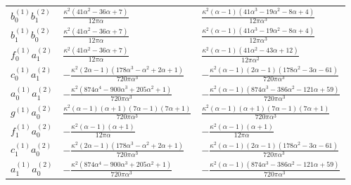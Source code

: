 {\begin{longtable}{lll}
$b_0^{(1)} b_1^{(2)}$ & $\frac{\kappa^{2} \left(41 \alpha^{2} - 36 \alpha + 7\right)}{12 \pi \alpha}$ & $\frac{\kappa^{2} \left(\alpha - 1\right) \left(41 \alpha^{3} - 19 \alpha^{2} - 8 \alpha + 4\right)}{12 \pi \alpha^{3}}$\\
$b_1^{(1)} b_0^{(2)}$ & $\frac{\kappa^{2} \left(41 \alpha^{2} - 36 \alpha + 7\right)}{12 \pi \alpha}$ & $\frac{\kappa^{2} \left(\alpha - 1\right) \left(41 \alpha^{3} - 19 \alpha^{2} - 8 \alpha + 4\right)}{12 \pi \alpha^{3}}$\\
$f_0^{(1)} a_1^{(2)}$ & $\frac{\kappa^{2} \left(41 \alpha^{2} - 36 \alpha + 7\right)}{12 \pi \alpha}$ & $\frac{\kappa^{2} \left(\alpha - 1\right) \left(41 \alpha^{2} - 43 \alpha + 12\right)}{12 \pi \alpha^{2}}$\\
$c_0^{(1)} a_1^{(2)}$ & $- \frac{\kappa^{2} \left(2 \alpha - 1\right) \left(178 \alpha^{3} - \alpha^{2} + 2 \alpha + 1\right)}{720 \pi \alpha^{3}}$ & $- \frac{\kappa^{2} \left(\alpha - 1\right) \left(2 \alpha - 1\right) \left(178 \alpha^{2} - 3 \alpha - 61\right)}{720 \pi \alpha^{3}}$\\
$a_0^{(1)} a_1^{(2)}$ & $- \frac{\kappa^{2} \left(874 \alpha^{4} - 900 \alpha^{3} + 205 \alpha^{2} + 1\right)}{720 \pi \alpha^{3}}$ & $- \frac{\kappa^{2} \left(\alpha - 1\right) \left(874 \alpha^{3} - 386 \alpha^{2} - 121 \alpha + 59\right)}{720 \pi \alpha^{3}}$\\
$g^{(1)} a_0^{(2)}$ & $\frac{\kappa^{2} \left(\alpha - 1\right) \left(\alpha + 1\right) \left(7 \alpha - 1\right) \left(7 \alpha + 1\right)}{720 \pi \alpha^{3}}$ & $\frac{\kappa^{2} \left(\alpha - 1\right) \left(\alpha + 1\right) \left(7 \alpha - 1\right) \left(7 \alpha + 1\right)}{720 \pi \alpha^{3}}$\\
$f_1^{(1)} a_0^{(2)}$ & $- \frac{\kappa^{2} \left(\alpha - 1\right) \left(\alpha + 1\right)}{12 \pi \alpha}$ & $- \frac{\kappa^{2} \left(\alpha - 1\right) \left(\alpha + 1\right)}{12 \pi \alpha}$\\
$c_1^{(1)} a_0^{(2)}$ & $- \frac{\kappa^{2} \left(2 \alpha - 1\right) \left(178 \alpha^{3} - \alpha^{2} + 2 \alpha + 1\right)}{720 \pi \alpha^{3}}$ & $- \frac{\kappa^{2} \left(\alpha - 1\right) \left(2 \alpha - 1\right) \left(178 \alpha^{2} - 3 \alpha - 61\right)}{720 \pi \alpha^{3}}$\\
$a_1^{(1)} a_0^{(2)}$ & $- \frac{\kappa^{2} \left(874 \alpha^{4} - 900 \alpha^{3} + 205 \alpha^{2} + 1\right)}{720 \pi \alpha^{3}}$ & $- \frac{\kappa^{2} \left(\alpha - 1\right) \left(874 \alpha^{3} - 386 \alpha^{2} - 121 \alpha + 59\right)}{720 \pi \alpha^{3}}$\\
\bottomrule\end{longtable}}

